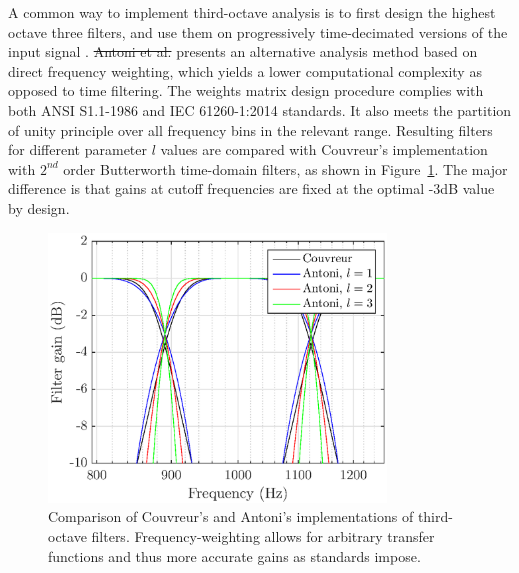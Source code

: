 \documentclass[sensors,article,submit,moreauthors,pdftex,10pt,a4paper]{mdpi}
\providecommand{\DIFdeltex}[1]{{\protect\color{red}\sout{#1}}}                      %
\providecommand{\DIFaddend}{} %
\providecommand{\DIFdelbegin}{} %
\providecommand{\DIFdelend}{} %
\providecommand{\DIFdel}[1]{\texorpdfstring{\DIFdeltex{#1}}{}} %
\begin{document}
\DIFaddend A common way to implement third-octave analysis is to first design the highest octave three filters, and use them on progressively time-decimated versions of the input signal \cite{davis1986}. \DIFdelbegin \DIFdel{Antoni et al. }\DIFdelend \cite{antoni2010} presents an alternative analysis method based on direct frequency weighting, which yields a lower computational complexity as opposed to time filtering. The weights matrix design procedure complies with both ANSI S1.1-1986 \cite{citeulike:9580295} and IEC 61260-1:2014 \cite{iec-norm} standards. It also meets the partition of unity principle over all frequency bins in the relevant range. Resulting filters for different parameter $l$ values are compared with Couvreur's implementation \cite{couvreur} with $2^{nd}$ order Butterworth time-domain filters, as shown in Figure~\ref{fig:freq_filt}. The major difference is that gains at cutoff frequencies are fixed at the optimal -3dB value by design.\\

\begin{figure}[htbp]
	\centering
		\includegraphics[width=0.8\textwidth]{figures/tob_imp.eps}
	\caption{Comparison of Couvreur's and Antoni's implementations of third-octave filters. Frequency-weighting allows for arbitrary transfer functions and thus more accurate gains as standards impose.}
	\label{fig:freq_filt}
\end{figure}
\end{document}
